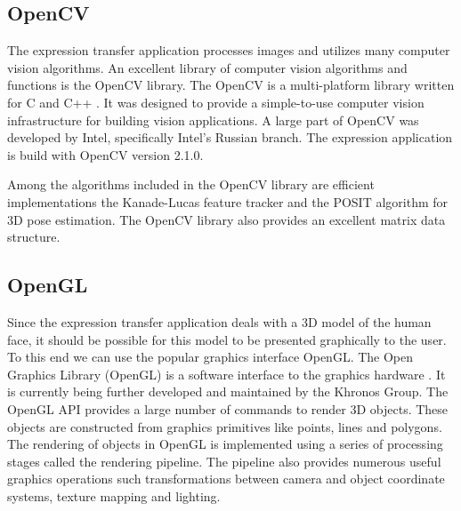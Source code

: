 \documentclass[11pt,a4paper]{report}
\begin{document}
\subsection{OpenCV}
The expression transfer application processes images and utilizes many computer
vision algorithms. An excellent library of computer vision algorithms and
functions is the OpenCV library. The OpenCV is a multi-platform library
written for C and C++ \cite{opencv}. It was designed to provide a simple-to-use
computer vision infrastructure for building vision applications. A large part
of OpenCV was developed by Intel, specifically Intel's Russian branch. The
expression application is build with OpenCV version 2.1.0.

Among the algorithms included in the OpenCV library are efficient implementations the Kanade-Lucas feature tracker
and the POSIT algorithm for 3D pose estimation. The OpenCV library also provides
an excellent matrix data structure.

\subsection{OpenGL}
Since the expression transfer
application deals with a 3D model of the human face, it should be possible for
this model to be presented graphically to the user. To
this end we can use the popular graphics interface OpenGL. The Open Graphics Library (OpenGL) is a software interface to the graphics
hardware \cite{opengl}. It is currently being further developed and maintained
by the Khronos Group. The OpenGL API provides a large
number of commands to render 3D objects. These objects are constructed
from graphics primitives like points, lines and polygons. The rendering of
objects in OpenGL is
implemented using a series of processing stages called the rendering
pipeline. The pipeline also provides numerous useful graphics operations such transformations
between camera and object coordinate systems, texture mapping and lighting. 
\end{document}
